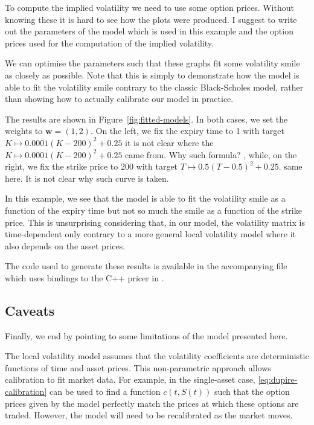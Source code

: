 \documentclass[english]{article}
\newcommand{\comment}[1]{\color{blue}#1\color{black}}
\numberwithin{equation}{section}
\numberwithin{figure}{section}
\theoremstyle{bolddescit}
\theoremstyle{definition}
\theoremstyle{definition}
\theoremstyle{plain}
\theoremstyle{plain}
\theoremstyle{bolddesc}
\theoremstyle{plain}
\theoremstyle{remark}
\begin{document}
\comment{To compute the implied volatility we need to use some option prices. Without knowing these it is hard to see how the plots were produced. I suggest to write out the parameters of the model which is used in this example and the option prices used for the computation of the implied volatility.}

We can optimise the parameters such that these graphs fit some volatility smile as closely as possible. Note that this is simply to demonstrate how the model is able to fit the volatility smile contrary to the classic Black-Scholes model, rather than showing how to actually calibrate our model in practice.

The results are shown in Figure~\ref{fig:fitted-models}. In both cases, we set the weights to $\mathbf{w} = (1,2)$. On the left, we fix the expiry time to 1 with target $K \mapsto 0.0001 (K - 200)^2 + 0.25$
\comment{it is not clear where the $K \mapsto 0.0001 (K - 200)^2 + 0.25$ came from. Why such formula?}
, while, on the right, we fix the strike price to 200 with target $T \mapsto 0.5 (T - 0.5)^2 + 0.25$. %
\comment{same here. It is not clear why such curve is taken.}

In this example, we see that the model is able to fit the volatility smile as a function of the expiry time but not so much the smile as a function of the strike price. This is unsurprising considering that, in our model, the volatility matrix is time-dependent only contrary to a more general local volatility model where it also depends on the asset prices.

The code used to generate these results is available in the accompanying file  which uses bindings to the C++ pricer in .

\subsection{Caveats}

Finally, we end by pointing to some limitations of the model presented here.

The local volatility model assumes that the volatility coefficients are deterministic functions of time and asset prices. This non-parametric approach allows calibration to fit market data. For example, in the single-asset case, \eqref{eq:dupire-calibration} can be used to find a function $c(t,S(t))$ such that the option prices given by the model perfectly match the prices at which these options are traded. However, the model will need to be recalibrated as the market moves.
\end{document}

